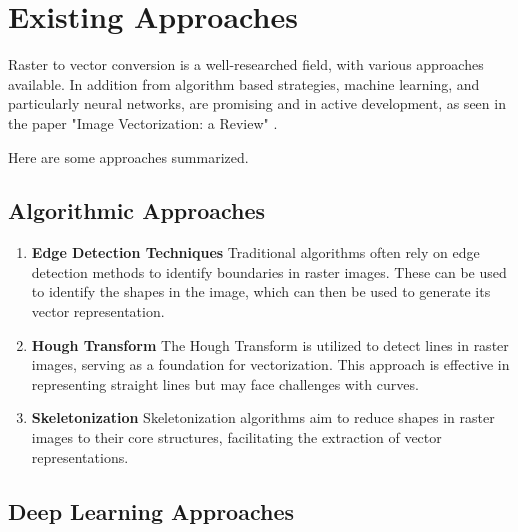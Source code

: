 \documentclass[12pt, a4paper, titlepage]{report}
\begin{document}
\section{Existing Approaches}

Raster to vector conversion is a well-researched field, with various approaches available. In addition from algorithm based strategies, machine learning, and particularly neural networks, are promising and in active development, as seen in the paper "Image Vectorization: a Review" \cite{dziuba_image_2023}.

Here are some approaches summarized.

\subsection{Algorithmic Approaches}

\begin{enumerate}[label=\Roman*.]
   \item \textbf{Edge Detection Techniques} Traditional algorithms often rely on edge detection methods to identify boundaries in raster images. These can be used to identify the shapes in the image, which can then be used to generate its vector representation.

   \item \textbf{Hough Transform} The Hough Transform is utilized to detect lines in raster images, serving as a foundation for vectorization. This approach is effective in representing straight lines but may face challenges with curves.

   \item \textbf{Skeletonization} Skeletonization algorithms aim to reduce shapes in raster images to their core structures, facilitating the extraction of vector representations.
\end{enumerate}

\subsection{Deep Learning Approaches}
\end{document}
